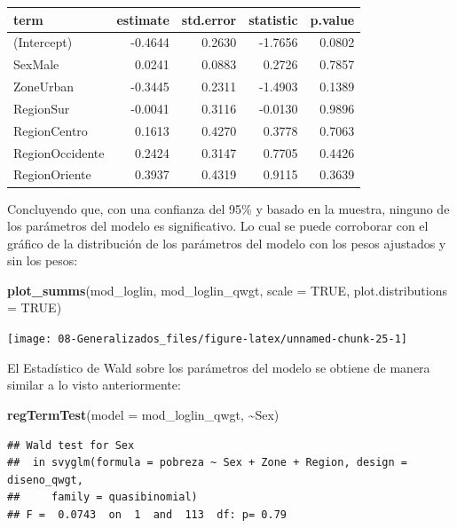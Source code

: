 \documentclass[
  12pt,
]{book}
\newenvironment{Shaded}{\begin{snugshade}}{\end{snugshade}}
\newcommand{\AttributeTok}[1]{\textcolor[rgb]{0.13,0.29,0.53}{#1}}
\newcommand{\ConstantTok}[1]{\textcolor[rgb]{0.56,0.35,0.01}{#1}}
\newcommand{\FunctionTok}[1]{\textcolor[rgb]{0.13,0.29,0.53}{\textbf{#1}}}
\newcommand{\NormalTok}[1]{#1}
\newcommand{\SpecialCharTok}[1]{\textcolor[rgb]{0.81,0.36,0.00}{\textbf{#1}}}
\begin{document}
\begin{tabular}{l|r|r|r|r}
\hline
term & estimate & std.error & statistic & p.value\\
\hline
(Intercept) & -0.4644 & 0.2630 & -1.7656 & 0.0802\\
\hline
SexMale & 0.0241 & 0.0883 & 0.2726 & 0.7857\\
\hline
ZoneUrban & -0.3445 & 0.2311 & -1.4903 & 0.1389\\
\hline
RegionSur & -0.0041 & 0.3116 & -0.0130 & 0.9896\\
\hline
RegionCentro & 0.1613 & 0.4270 & 0.3778 & 0.7063\\
\hline
RegionOccidente & 0.2424 & 0.3147 & 0.7705 & 0.4426\\
\hline
RegionOriente & 0.3937 & 0.4319 & 0.9115 & 0.3639\\
\hline
\end{tabular}

Concluyendo que, con una confianza del 95\% y basado en la muestra, ninguno de los parámetros del modelo es significativo. Lo cual se puede corroborar con el gráfico de la distribución de los parámetros del modelo con los pesos ajustados y sin los pesos:

\begin{Shaded}
\begin{Highlighting}[]
\FunctionTok{plot\_summs}\NormalTok{(mod\_loglin, mod\_loglin\_qwgt, }
             \AttributeTok{scale =} \ConstantTok{TRUE}\NormalTok{, }\AttributeTok{plot.distributions =} \ConstantTok{TRUE}\NormalTok{)}
\end{Highlighting}
\end{Shaded}

\texttt{[image: 08-Generalizados\_files/figure-latex/unnamed-chunk-25-1]}

El Estadístico de Wald sobre los parámetros del modelo se obtiene de manera similar a lo visto anteriormente:

\begin{Shaded}
\begin{Highlighting}[]
\FunctionTok{regTermTest}\NormalTok{(}\AttributeTok{model =}\NormalTok{ mod\_loglin\_qwgt, }\SpecialCharTok{\textasciitilde{}}\NormalTok{Sex)}
\end{Highlighting}
\end{Shaded}

\begin{verbatim}
## Wald test for Sex
##  in svyglm(formula = pobreza ~ Sex + Zone + Region, design = diseno_qwgt, 
##     family = quasibinomial)
## F =  0.0743  on  1  and  113  df: p= 0.79
\end{verbatim}
\end{document}
